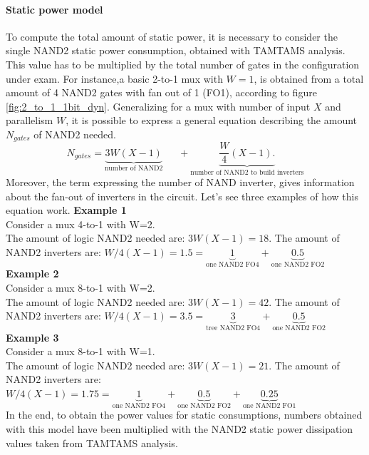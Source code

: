 \paragraph{Static power model}
To compute the total amount of static power, it is necessary to consider the single NAND2 static power consumption, obtained with TAMTAMS analysis. This value has to be multiplied by the total number of gates in the configuration under exam. For instance,a basic 2-to-1 mux with $W=1$, is obtained from a total amount of 4 NAND2 gates  with fan out of 1 (FO1), according to figure \ref{fig:2_to_1_1bit_dyn}. Generalizing for a mux with number of input $X$ and parallelism $W$, it is possible to express a general equation describing the amount $N_{gates}$ of NAND2 needed.
\begin{equation}
N_{gates} = \underbrace{3 W \left( X-1 \right)}_\text{number of NAND2} \ \ \ \ \ \ \  + \underbrace{\frac{W}{4}\left( X-1\right) .}_\text{number of NAND2 to build inverters}
\label{magic}
\end{equation}
Moreover, the term expressing the number of NAND inverter, gives information about the fan-out of inverters in the circuit. Let's see three examples of how this equation work.
\textbf{Example 1}\\
Consider a mux 4-to-1 with W=2.\\
The amount of logic NAND2 needed are:  $3 W \left( X-1 \right) = 18. $
The amount of NAND2 inverters are: $W/4\left( X-1\right) = 1.5=  \underbrace{1}_\text{one NAND2 FO4} + \underbrace{0.5}_\text{one NAND2 FO2}$\\
\textbf{Example 2}\\
Consider a mux 8-to-1 with W=2.\\
The amount of logic NAND2 needed are:  $3 W \left( X-1 \right) = 42. $
The amount of NAND2 inverters are: $W/4\left( X-1\right) = 3.5=  \underbrace{3}_\text{tree NAND2 FO4} + \underbrace{0.5}_\text{one NAND2 FO2}$\\
\textbf{Example 3}\\
Consider a mux 8-to-1 with W=1.\\
The amount of logic NAND2 needed are:  $3 W \left( X-1 \right) = 21. $
The amount of NAND2 inverters are: $W/4\left( X-1\right) = 1.75=  \underbrace{1}_\text{one NAND2 FO4} + \underbrace{0.5}_\text{one NAND2 FO2}+  \underbrace{0.25}_\text{one NAND2 FO1}$\\
In the end, to obtain the power values for static consumptions, numbers obtained with this model have been multiplied with the NAND2 static power dissipation values taken from TAMTAMS analysis.

